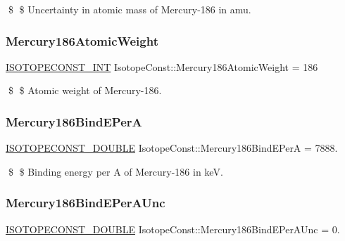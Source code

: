 \$ \$ Uncertainty in atomic mass of Mercury-\/186 in amu. \mbox{\label{group___isotope_const-_mercury-_hg186_ga7d94c8cda4bbcb1fbfac6de280e3be9b}} 
\subsubsection{\texorpdfstring{Mercury186\+Atomic\+Weight}{Mercury186AtomicWeight}}
{\footnotesize\ttfamily \mbox{\hyperlink{group___isotope_const-_macros_ga5f18360b3e99483a35c32d789e62621c}{I\+S\+O\+T\+O\+P\+E\+C\+O\+N\+S\+T\+\_\+\+I\+NT}} Isotope\+Const\+::\+Mercury186\+Atomic\+Weight = 186}

\$ \$ Atomic weight of Mercury-\/186. \mbox{\label{group___isotope_const-_mercury-_hg186_ga33b37a713fa48aa05988b28356fa424e}} 
\subsubsection{\texorpdfstring{Mercury186\+Bind\+E\+PerA}{Mercury186BindEPerA}}
{\footnotesize\ttfamily \mbox{\hyperlink{group___isotope_const-_macros_ga8f45a7272ce02c0b4c65c44636ed719a}{I\+S\+O\+T\+O\+P\+E\+C\+O\+N\+S\+T\+\_\+\+D\+O\+U\+B\+LE}} Isotope\+Const\+::\+Mercury186\+Bind\+E\+PerA = 7888.}

\$ \$ Binding energy per A of Mercury-\/186 in keV. \mbox{\label{group___isotope_const-_mercury-_hg186_ga044223d9a740e4694ee1089aea52a47d}} 
\subsubsection{\texorpdfstring{Mercury186\+Bind\+E\+Per\+A\+Unc}{Mercury186BindEPerAUnc}}
{\footnotesize\ttfamily \mbox{\hyperlink{group___isotope_const-_macros_ga8f45a7272ce02c0b4c65c44636ed719a}{I\+S\+O\+T\+O\+P\+E\+C\+O\+N\+S\+T\+\_\+\+D\+O\+U\+B\+LE}} Isotope\+Const\+::\+Mercury186\+Bind\+E\+Per\+A\+Unc = 0.}

